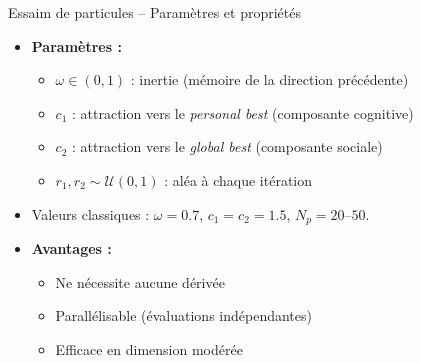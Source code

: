 \documentclass[11pt,aspectratio=169]{beamer}
\begin{document}
\begin{frame}{Essaim de particules -- Paramètres et propriétés}

\begin{itemize}

\item \textbf{Paramètres :}
  \begin{itemize}
    \item $\omega \in (0, 1)$ : inertie (mémoire de la direction précédente)\newline
    \item $c_1$ : attraction vers le \textit{personal best} (composante cognitive)\newline
    \item $c_2$ : attraction vers le \textit{global best} (composante sociale)\newline
    \item $r_1, r_2 \sim \mathcal{U}(0,1)$ : aléa à chaque itération\newline
  \end{itemize}

\item Valeurs classiques : $\omega = 0.7$, $c_1 = c_2 = 1.5$, $N_p = 20$--$50$.\newline

\item \textbf{Avantages :}
  \begin{itemize}
    \item Ne nécessite aucune dérivée\newline
    \item Parallélisable (évaluations indépendantes)\newline
    \item Efficace en dimension modérée
  \end{itemize}

\end{itemize}

\end{frame}
\end{document}
